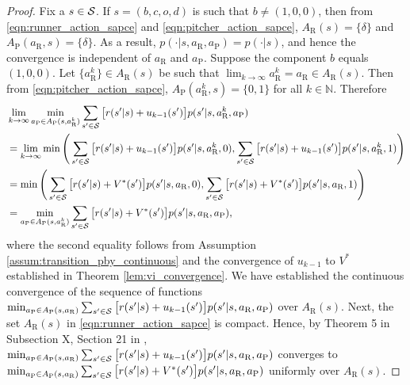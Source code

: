 \documentclass[11pt]{article}
\begin{document}
\begin{proof}
           Fix a $s \in {\cal S}$. If $s = (b,c,o,d)$ is such that $b \neq (1,0,0)$, then from \eqref{eqn:runner_action_sapce} and \eqref{eqn:pitcher_action_sapce},  $A_\text{R}(s) = \{\delta\}$ and $ A_\text{P}(a_\text{R},s) = \{\delta\}$. As a result, $p(\cdot|s,a_\text{R},a_\text{P}) = p(\cdot|s)$, and hence the convergence is independent of $a_\text{R}$ and $a_\text{P}$. Suppose the component $b$ equals $(1,0,0)$. Let $\{a_\text{R}^k\} \in A_\text{R}(s)$ be such that $\lim_{k \to \infty}a_\text{R}^k = a_\text{R} \in A_\text{R}(s)$. Then from  \eqref{eqn:pitcher_action_sapce}, $A_\text{P}(a_\text{R}^k,s) = \{0,1\}$ for all $k \in \mathbb{N}$. Therefore
           \begingroup
           \allowdisplaybreaks
           \begin{align*}
           &\lim_{k \to \infty}\min_{a_\text{P} \in A_\text{P}(s,a_\text{R}^k)}\sum_{s' \in {\cal S}}\big[r(s'|s) + u_{k-1}(s')\big]p(s'|s,a_\text{R}^k,a_\text{P}) \\
           &= \lim_{k \to \infty}\min\Bigg(\sum_{s' \in {\cal S}}\big[r(s'|s) + u_{k-1}(s')\big]p(s'|s,a_\text{R}^k,0),\sum_{s' \in {\cal S}}\big[r(s'|s) + u_{k-1}(s')\big]p(s'|s,a_\text{R}^k,1)\Bigg)\\
           &= \min\Bigg(\sum_{s' \in {\cal S}}\big[r(s'|s) + V^*(s')\big]p(s'|s,a_\text{R},0),\sum_{s' \in {\cal S}}\big[r(s'|s) + V^*(s')\big]p(s'|s,a_\text{R},1)\Bigg)\\
           &= \min_{a_\text{P} \in A_\text{P}(s,a_\text{R}^k)}\sum_{s' \in {\cal S}}\big[r(s'|s) + V^*(s')\big]p(s'|s,a_\text{R},a_\text{P}),
           \end{align*}
           \endgroup
           where the second equality follows from Assumption \ref{assum:transition_pby_continuous} and the convergence of $u_{k-1}$ to $V^*$ established in Theorem \ref{lem:vi_convergence}. We have established the continuous convergence of the sequence of functions $\min_{a_\text{P} \in A_\text{P}(s,a_\text{R})}\sum_{s' \in {\cal S}}\big[r(s'|s) + u_{k-1}(s')\big]p(s'|s,a_\text{R},a_\text{P})$ over $A_\text{R}(s)$. Next, the set $A_\text{R}(s)$ in \eqref{eqn:runner_action_sapce}   is compact. Hence, by Theorem 5 in Subsection X, Section 21 in  \parencite{kuratowski_topology_2014}, $\min_{a_\text{P} \in A_\text{P}(s,a_\text{R})}\sum_{s' \in {\cal S}}\big[r(s'|s) + u_{k-1}(s')\big]p(s'|s,a_\text{R},a_\text{P})$ converges to $\min_{a_\text{P} \in A_\text{P}(s,a_\text{R})}\sum_{s' \in {\cal S}}\big[r(s'|s) + V^*(s')\big]p(s'|s,a_\text{R},a_\text{P})$ uniformly over $A_\text{R}(s)$.
    

\end{proof}
\end{document}

